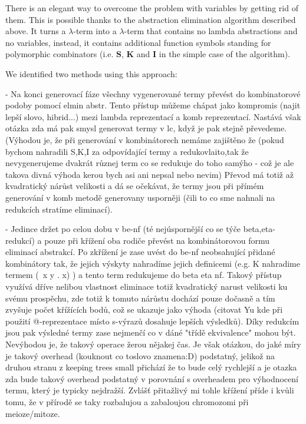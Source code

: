 \documentclass{sig-alternate}
\newcommand{\lterm}{$\lambda$-term\xspace}
\newcommand{\Scomb }{\mathbf{S}}
\newcommand{\Kcomb }{\mathbf{K}}
\newcommand{\Icomb }{\mathbf{I}}
\newcommand{\red}[1]{{\color{red} #1}}
\begin{document}
There is an elegant way to overcome the problem with variables by getting rid of them.
This is possible thanks to the abstraction elimination algorithm described above.
It turns a \lterm into a \lterm that contains no lambda abstractions
and no variables, instead, it contains additional function symbols standing for 
polymorphic combinators (i.e. $\Scomb$, $\Kcomb$ and $\Icomb$ 
in the simple case of the algorithm). 

We identified two methods using this approach:

\red{


- Na konci generovací fáze všechny vygenerované termy převést do kombinatorové
  podoby pomocí elmin abstr. Tento přístup můžeme chápat jako kompromis (najit lepší slovo, hibrid...) mezi lambda reprezentací a komb reprezentací. Nastává však otázka zda má pak smysl generovat termy v lc, když je pak stejně převedeme. (Výhodou je, že
při generování v kombinátorech nemáme zajištěno že (pokud bychom nahradili S,K,I 
za odpovídající termy a redukovlaito,tak že nevygenerujeme dvakrát různej term co se redukuje do toho samýho - což je ale takova divná výhoda kerou bych asi ani nepsal nebo nevim) Převod má totiž až kvadratický nárůst velikosti a dá se očekávat, že termy jsou při přímém generování v komb metodě generovany usporněji (čili to co sme nahnali na redukcích stratíme eliminací).

- Jedince držet po celou dobu v be-nf (té nejúspornější co se týče 
  beta,eta-redukcí) a pouze při křížení oba rodiče převést na kombinátorovou formu
  eliminací abstrakcí. Po zkřížení je zase uvést do be-nf neobsahující přidané kombinátory tak, že jejich výskyty nahradíme jejich definicemi 
  (e.g. K nahradime termem (\ x y . x) ) a tento term redukujeme 
  do beta eta nf. Takový přístup využívá dříve nelibou vlastnost eliminace totiž kvadratický narust velikosti ku svému prospěchu, zde totiž k tomuto nárůstu dochází pouze dočasně a tím zvyšuje počet křížících bodů, což se ukazuje jako výhoda (citovat Yu kde při použití @-reprezentace místo s-výrazů dosahuje lepších výsledků). Díky redukcím jsou pak výsledné termy zase nejmenčí co v dáné "třídě ekvivalence" mohou být. Nevýhodou je, že takový operace žerou nějakej čas. Je však otázkou, do jaké míry je takový overhead (kouknout co toslovo znamena:D) podstatný, jelikož na druhou stranu 
  z keeping trees small přichází že to bude celý rychlejší a je otazka zda bude takový overhead podstatný v porovnání s overheadem pro výhodnocení termu, který je typicky nejdražší. Zvlášť přitažlivý mi tohle křížení příde i kvůli tomu, že v přírodě se taky rozbalujou a zabaloujou chromozomi při meioze/mitoze.
  
}
\end{document}
